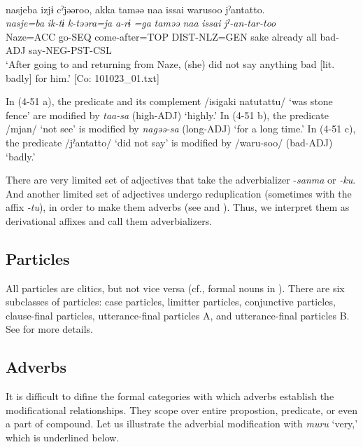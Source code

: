 \ex{}\\ 
     \glll  nasjeba  izjɨ  cˀjəəroo,  akka  taməə   naa  issai  warusoo  jˀantatto.\\
      \textit{nasje=ba}  \textit{ik-tɨ}  \textit{k-təəra=ja}  \textit{a-rɨ} \textit{=ga}  \textit{taməə}  \textit{naa}  \textit{issai}  \textit{}  \textit{jˀ-an-tar-too}\\
      Naze=ACC  go-SEQ  come-after=TOP  DIST-NLZ=GEN  sake                                                already  all  bad-ADJ  say-NEG-PST-CSL\\
      \glt ‘After going to and returning from Naze, (she) did not say anything bad [lit. badly] for him.’    [Co: 101023\_01.txt]
    \z
\z

In (4-51 a), the predicate and its complement /isigaki natutattu/ ‘was stone fence’ are modified by \textit{taa-sa} (high-ADJ) ‘highly.’ In (4-51 b), the predicate /mjan/ ‘not see’ is modified by \textit{nagəə-sa} (long-ADJ) ‘for a long time.’ In (4-51 c), the predicate /jˀantatto/ ‘did not say’ is modified by /waru-soo/ (bad-ADJ) ‘badly.’

There are very limited set of adjectives that take the adverbializer -\textit{sanma} or \textit{{}-ku}. And another limited set of adjectives undergo reduplication (sometimes with the affix \textit{{}-tu}), in order to make them adverbs (see  and ). Thus, we interpret them as derivational affixes and call them adverbializers.

\subsection{Particles}\label{sec:4.3.5}

All particles are clitics, but not vice versa (cf., formal nouns in ). There are six subclasses of particles: case particles, limitter particles, conjunctive particles, clause-final particles, utterance-final particles A, and utterance-final particles B. See  for more details.

\subsection{Adverbs}\label{sec:4.3.6}

It is difficult to difine the formal categories with which adverbs establish the modificational relationships. They scope over entire propostion, predicate, or even a part of compound. Let us illustrate the adverbial modification with \textit{muru} ‘very,’ which is underlined below.

